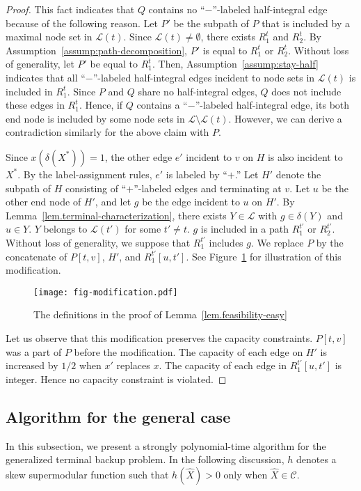 \documentclass{article}
\newcommand{\Cfam}{\mathcal{C}}
\newcommand{\Lfam}{\mathcal{L}}
\begin{document}
\begin{proof}
  This fact indicates that $Q$ contains no ``$-$''-labeled half-integral
  edge because of the following reason.
  Let $P'$ be the subpath of $P$ that is included by a maximal node set
  in $\Lfam(t)$.
  Since $\Lfam(t) \neq \emptyset$, there exists $R^t_1$ and $R^t_2$.
  By Assumption~\ref{assump:path-decomposition},
  $P'$ is equal to $R^t_1$ or $R^t_2$. Without loss of generality, let $P'$ be
  equal to $R^t_1$.
  Then, Assumption~\ref{assump:stay-half} indicates that 
  all ``$-$''-labeled half-integral edges incident to node sets in
  $\Lfam(t)$  is included in $R^t_1$.
  Since $P$ and $Q$ share no half-integral edges, $Q$ does not include
  these edges in $R^t_1$.
  Hence, if $Q$ contains a ``$-$''-labeled half-integral edge, its both
  end node is included by some node sets in $\Lfam \setminus \Lfam(t)$.
  However, we can derive a contradiction similarly for the above claim
  with $P$.

  Since $x(\delta(X^*))=1$,
  the other edge $e'$ incident to $v$ on $H$ is also incident to $X^*$.
  By the label-assignment rules, $e'$ is labeled by ``$+$.''
  Let $H'$ denote the subpath of
  $H$ consisting of ``$+$''-labeled edges and terminating at $v$.
  Let $u$ be the other end node of $H'$,
  and let $g$ be the edge incident to $u$ on $H'$.
  By Lemma~\ref{lem.terminal-characterization}, there exists $Y \in
  \Lfam$ with
  $g \in \delta(Y)$ and  $u \in Y$.
  $Y$ belongs to $\Lfam(t')$ for some $t' \neq t$.
  $g$ is included in a path $R_1^{t'}$ or $R_{2}^{t'}$.
  Without loss of generality, we suppose that $R_1^{t'}$ includes $g$.
  We replace $P$ by the concatenate of $P[t,v]$, $H'$, and $R_1^{t'}[u,t']$.
  See Figure~\ref{fig.modification} for illustration of this modification.
  
  \begin{figure}
  \centering
   \texttt{[image: fig-modification.pdf]}
   \caption{The definitions in the proof of Lemma~\ref{lem.feasibility-easy}}
   \label{fig.modification}
  \end{figure}
  
  Let us observe that this modification preserves the capacity
  constraints.
  $P[t,v]$ was a part of $P$ before the modification.
  The capacity of each edge on $H'$ is increased by $1/2$ when $x'$
  replaces $x$.
  The capacity of each edge in $R_1^{t'}[u,t']$ is integer.
  Hence no capacity constraint is violated.
 \end{proof}


\subsection{Algorithm for the general case}
In this subsection, we present a strongly polynomial-time algorithm for the generalized terminal
backup problem.
In the following discussion,
$h$ denotes a skew supermodular function such that $h(\hat{X})>0$
only when $\hat{X} \in \Cfam$.
\end{document}
